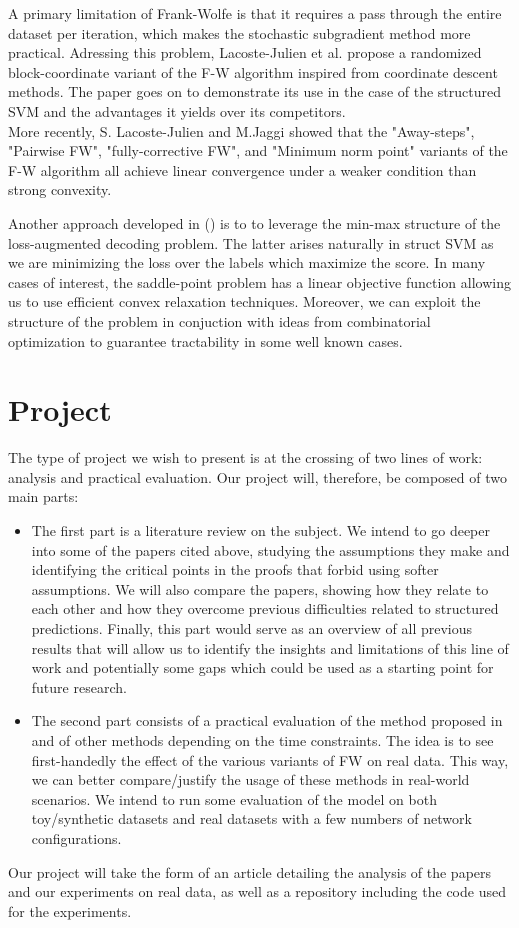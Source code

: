 \documentclass{article}
\begin{document}
A primary limitation of Frank-Wolfe is that it requires a pass through the
entire dataset per iteration, which makes the stochastic subgradient method more
practical. Adressing this problem, Lacoste-Julien et al.
\cite{DBLP:journals/corr/abs-1207-4747} propose a randomized block-coordinate
variant of the F-W algorithm inspired from coordinate descent methods. The paper
goes on to demonstrate its use in the case of the structured SVM and the
advantages it yields over its competitors.\\ More recently, S. Lacoste-Julien
and M.Jaggi \cite{2015arXiv151105932L} showed that the "Away-steps", "Pairwise
FW", "fully-corrective FW", and "Minimum norm point" variants of the F-W
algorithm all achieve linear convergence under a weaker condition than strong
convexity.

Another approach developed in (\cite{dualextraSimon}) is to to leverage the
min-max structure of the loss-augmented decoding problem. The latter arises
naturally in struct SVM as we are minimizing the loss over the labels which
maximize the score. In many cases of interest, the saddle-point problem has a
linear objective function allowing us to use efficient convex relaxation
techniques. Moreover, we can exploit the structure of the problem in conjuction
with ideas from combinatorial optimization to guarantee tractability in some
well known cases.

\section*{Project}
The type of project we wish to present is at the crossing of two lines of work:
analysis and practical evaluation. Our project will, therefore, be composed of
two main parts:
\begin{itemize}
    \item The first part is a literature review on the subject. We intend to go
deeper into some of the papers cited above, studying the assumptions they make
and identifying the critical points in the proofs that forbid using softer
assumptions. We will also compare the papers, showing how they relate to each
other and how they overcome previous difficulties related to structured
predictions. Finally, this part would serve as an overview of all previous
results that will allow us to identify the insights and limitations of this
line of work and potentially some gaps which could be used
as a starting point for future research.
    \item The second part consists of a practical evaluation of the method
proposed in and of other methods depending on the time constraints. The idea is
to see first-handedly the effect of the various variants of FW on real data.
This way, we can better compare/justify the usage of these methods in real-world
scenarios. We intend to run some evaluation of the model on both toy/synthetic
datasets and real datasets with a few numbers of network configurations.
\end{itemize}


Our project will take the form of an article detailing the analysis of the
papers and our experiments on real data, as well as a repository including the
code used for the experiments.

\nocite{*}
\printbibliography
\end{document}

